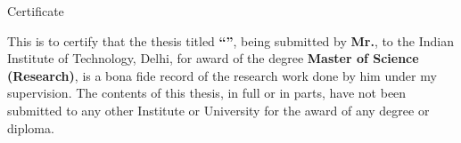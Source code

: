 \begin{center}
\LARGE{ Certificate} 
\end{center}

\vspace{0.5in}

\noindent This is to certify that the thesis titled {\bf ``\ThesisTitle{}''},
being submitted by {\bf Mr.\Auth{}}, to the Indian Institute of Technology, Delhi,
for award of the degree {\bf Master of Science (Research)},
is a bona fide record of the research work done by him under my supervision.
The contents of this thesis, in full or in parts, have not been submitted to any
other Institute or University for the award of any degree or diploma.

\vspace{1.5in}


\begin{flushright}
 \\
 \\
\\ 
 \\
\end{flushright}
